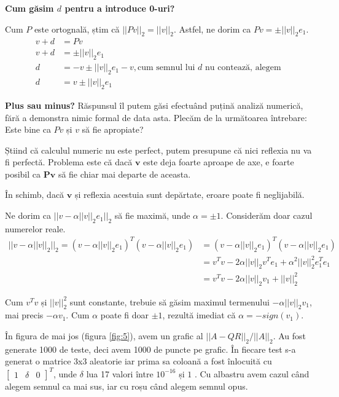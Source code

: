 \documentclass{exam}
\begin{document}
\textbf{Cum găsim $d$ pentru a introduce 0-uri?}

Cum $P$ este ortognală, știm că $||Pv||_2 = ||v||_2$. Astfel, ne dorim ca $Pv = \pm ||v||_2 e_1$.
\begin{align*}
	v + d & = P v                                                                            \\
	v + d & = \pm ||v||_2 e_1                                                                \\
	d     & = - v \pm ||v||_2 e_1 - v, \text{cum semnul lui } d \text{ nu contează, alegem } \\
	d     & = v \pm ||v||_2 e_1
\end{align*}

\textbf{Plus sau minus?} Răspunsul îl putem găsi efectuând puțină analiză
numerică, fără a demonstra nimic formal de data asta. Plecăm de la următoarea
întrebare: Este bine ca $Pv$ și $v$ să fie apropiate?

Știind că calculul numeric nu este perfect, putem presupune că nici
reflexia nu va fi perfectă. Problema este că dacă $\mathbf{v}$ este deja foarte
aproape de axe, e foarte posibil ca $\mathbf{Pv}$ să fie chiar mai departe de
aceasta.

În schimb, dacă $\mathbf{v}$ și reflexia acestuia sunt depărtate,
eroare poate fi neglijabilă.

Ne dorim ca $||v - \alpha ||v||_2 e_1||_2$ să fie maximă, unde
$\alpha = \pm 1$. Considerăm doar cazul numerelor reale.
\begin{align*}
	||v - \alpha ||v||_2||_2 = (v - \alpha ||v||_2 e_1)^T (v - \alpha ||v||_2 e_1) & = (v - \alpha ||v||_2 e_1)^T(v - \alpha ||v||_2 e_1)           \\
	                                                                               & = v^Tv - 2 \alpha ||v||_2 v^Te_1 + \alpha^2 ||v||_2^2 e_1^Te_1 \\
	                                                                               & = v^Tv - 2 \alpha ||v||_2 v_1 + ||v||_2^2
\end{align*}

Cum $v^Tv$ și $||v||_2^2$ sunt constante, trebuie să găsim maximul
termenului $- \alpha ||v||_2 v_1$, mai precis $- \alpha v_1$. Cum $\alpha$ poate
fi doar $\pm 1$, rezultă imediat că $\alpha = -sign(v_1)$.

\newpage
În figura de mai jos (figura \ref{fig:5}), avem un grafic al
$||A - QR||_2 / ||A||_2$. Au fost generate 1000 de teste, deci avem 1000 de puncte pe
grafic. În fiecare test s-a generat o matrice 3x3 aleatorie iar prima sa coloană
a fost înlocuită cu $\begin{bmatrix} 1 & \delta & 0 \end{bmatrix}^T$, unde
$\delta$ lua 17 valori între $10^{-16}$ și $1$ \cite{overton2023}. Cu albastru
avem cazul când alegem semnul ca mai sus, iar cu roșu când alegem semnul opus.
\end{document}
